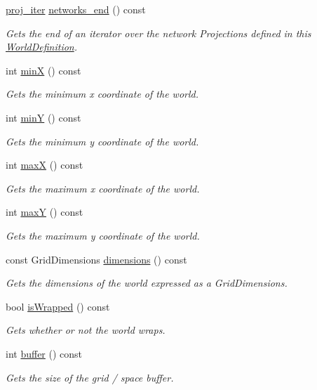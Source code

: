 \begin{DoxyCompactItemize}
\hyperlink{classrepast_1_1relogo_1_1_world_definition_ab1e044b19b6cb8c2e00110e48882afcc}{proj\-\_\-iter} \hyperlink{classrepast_1_1relogo_1_1_world_definition_a0bd3c542fb88b54f4c0c821fbf6008c4}{networks\-\_\-end} () const 
\begin{DoxyCompactList}\small\item\em Gets the end of an iterator over the network Projections defined in this \hyperlink{classrepast_1_1relogo_1_1_world_definition}{World\-Definition}. \end{DoxyCompactList}\item 
int \hyperlink{classrepast_1_1relogo_1_1_world_definition_a952ccd4e18c655e3242bdc7d32e062d1}{min\-X} () const 
\begin{DoxyCompactList}\small\item\em Gets the minimum x coordinate of the world. \end{DoxyCompactList}\item 
int \hyperlink{classrepast_1_1relogo_1_1_world_definition_a225c0ad83e73e13e5e5a55226ffa1dbb}{min\-Y} () const 
\begin{DoxyCompactList}\small\item\em Gets the minimum y coordinate of the world. \end{DoxyCompactList}\item 
int \hyperlink{classrepast_1_1relogo_1_1_world_definition_a08eb3fa1fd9d6aed840f713d23b9ff48}{max\-X} () const 
\begin{DoxyCompactList}\small\item\em Gets the maximum x coordinate of the world. \end{DoxyCompactList}\item 
int \hyperlink{classrepast_1_1relogo_1_1_world_definition_a3395109e5074f8bacbbd0bb0fa36f089}{max\-Y} () const 
\begin{DoxyCompactList}\small\item\em Gets the maximum y coordinate of the world. \end{DoxyCompactList}\item 
const Grid\-Dimensions \hyperlink{classrepast_1_1relogo_1_1_world_definition_a9fe209e15771261f76b7b793477e896f}{dimensions} () const 
\begin{DoxyCompactList}\small\item\em Gets the dimensions of the world expressed as a Grid\-Dimensions. \end{DoxyCompactList}\item 
bool \hyperlink{classrepast_1_1relogo_1_1_world_definition_a86887fe5eb38619d16388c27aa2688f2}{is\-Wrapped} () const 
\begin{DoxyCompactList}\small\item\em Gets whether or not the world wraps. \end{DoxyCompactList}\item 
int \hyperlink{classrepast_1_1relogo_1_1_world_definition_aa02082d00b9badcf1e3894dbdc08b586}{buffer} () const 
\begin{DoxyCompactList}\small\item\em Gets the size of the grid / space buffer. \end{DoxyCompactList}\end{DoxyCompactItemize}


